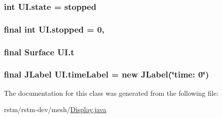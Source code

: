 \hypertarget{classUI_a016b1d8d5b1bdc3391322c0472b2b565}{
\subsubsection[{state}]{\setlength{\rightskip}{0pt plus 5cm}int U\-I.\-state = {\bf stopped}\hspace{0.3cm}{\ttfamily [private]}}}\label{classUI_a016b1d8d5b1bdc3391322c0472b2b565}
\hypertarget{classUI_a48163c6e2e10d9b13ddf30b12d262dd7}{
\subsubsection[{stopped}]{\setlength{\rightskip}{0pt plus 5cm}final int U\-I.\-stopped = 0\hspace{0.3cm}{\ttfamily [static]}, {\ttfamily [private]}}}\label{classUI_a48163c6e2e10d9b13ddf30b12d262dd7}
\hypertarget{classUI_a906f7250b5e2e31ee5c5db17514b6d4e}{
\subsubsection[{t}]{\setlength{\rightskip}{0pt plus 5cm}final {\bf Surface} U\-I.\-t\hspace{0.3cm}{\ttfamily [private]}}}\label{classUI_a906f7250b5e2e31ee5c5db17514b6d4e}
\hypertarget{classUI_aeeaff5b19707911ca9d97f526db6f077}{
\subsubsection[{time\-Label}]{\setlength{\rightskip}{0pt plus 5cm}final J\-Label U\-I.\-time\-Label = new J\-Label(\char`\"{}time\-: 0\char`\"{})\hspace{0.3cm}{\ttfamily [private]}}}\label{classUI_aeeaff5b19707911ca9d97f526db6f077}


The documentation for this class was generated from the following file\-:\begin{DoxyCompactItemize}
\item 
rstm/rstm-\/dev/mesh/\hyperlink{Display_8java}{Display.\-java}\end{DoxyCompactItemize}
